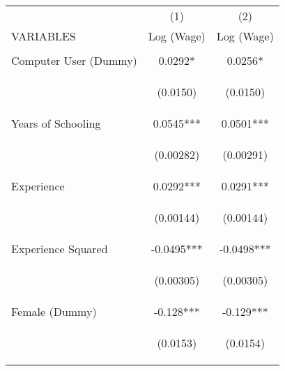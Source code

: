 \begin{center}
\begin{tabular}{lcc} \hline
 & (1) & (2) \\
VARIABLES & Log (Wage) & Log (Wage) \\ \hline
\vspace{4pt} & \begin{footnotesize}\end{footnotesize} & \begin{footnotesize}\end{footnotesize} \\
Computer User (Dummy) & 0.0292* & 0.0256* \\
\vspace{4pt} & \begin{footnotesize}(0.0150)\end{footnotesize} & \begin{footnotesize}(0.0150)\end{footnotesize} \\
Years of Schooling & 0.0545*** & 0.0501*** \\
\vspace{4pt} & \begin{footnotesize}(0.00282)\end{footnotesize} & \begin{footnotesize}(0.00291)\end{footnotesize} \\
Experience & 0.0292*** & 0.0291*** \\
\vspace{4pt} & \begin{footnotesize}(0.00144)\end{footnotesize} & \begin{footnotesize}(0.00144)\end{footnotesize} \\
Experience Squared & -0.0495*** & -0.0498*** \\
\vspace{4pt} & \begin{footnotesize}(0.00305)\end{footnotesize} & \begin{footnotesize}(0.00305)\end{footnotesize} \\
Female (Dummy) & -0.128*** & -0.129*** \\
\vspace{4pt} & \begin{footnotesize}(0.0153)\end{footnotesize} & \begin{footnotesize}(0.0154)\end{footnotesize} \\

\end{tabular}
\end{center}
